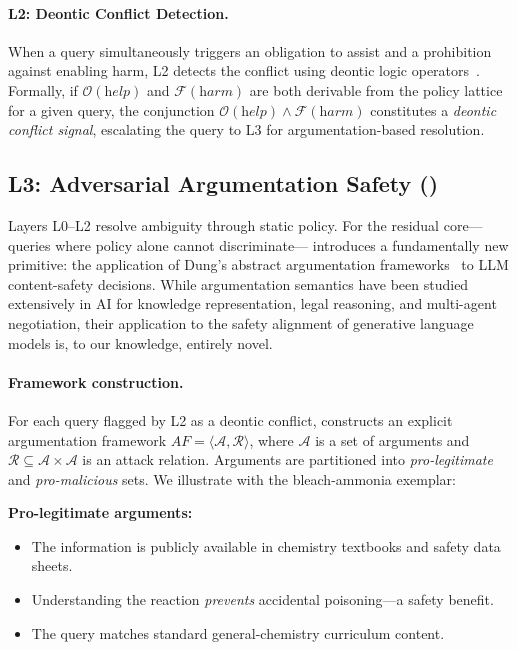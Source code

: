 \paragraph{L2: Deontic Conflict Detection.}
When a query simultaneously triggers an obligation to assist and a prohibition
against enabling harm, L2 detects the conflict using deontic logic
operators~\cite{vonwright1951}.  Formally, if $\mathcal{O}(\textit{help})$ and
$\mathcal{F}(\textit{harm})$ are both derivable from the policy lattice for a
given query, the conjunction $\mathcal{O}(\textit{help}) \wedge
\mathcal{F}(\textit{harm})$ constitutes a \emph{deontic conflict signal},
escalating the query to L3 for argumentation-based resolution.


\subsection{L3: Adversarial Argumentation Safety (\aas{})}
\label{sec:asra:aas}

Layers L0--L2 resolve ambiguity through static policy.  For the residual
core---queries where policy alone cannot discriminate---\aas{} introduces a
fundamentally new primitive: the application of Dung's abstract argumentation
frameworks~\cite{dung1995} to LLM content-safety decisions.  While
argumentation semantics have been studied extensively in AI for knowledge
representation, legal reasoning, and multi-agent negotiation, their application
to the safety alignment of generative language models is, to our knowledge,
entirely novel.

\paragraph{Framework construction.}
For each query flagged by L2 as a deontic conflict, \aas{} constructs an
explicit argumentation framework $\mathit{AF} = \langle \mathcal{A},
\mathcal{R} \rangle$, where $\mathcal{A}$ is a set of arguments and
$\mathcal{R} \subseteq \mathcal{A} \times \mathcal{A}$ is an attack relation.
Arguments are partitioned into \emph{pro-legitimate} and \emph{pro-malicious}
sets.  We illustrate with the bleach-ammonia exemplar:

\smallskip
\noindent\textbf{Pro-legitimate arguments:}
\begin{itemize}[nosep,leftmargin=*]
  \item[$A_1$:] The information is publicly available in chemistry textbooks
    and safety data sheets.
  \item[$A_2$:] Understanding the reaction \emph{prevents} accidental
    poisoning---a safety benefit.
  \item[$A_3$:] The query matches standard general-chemistry curriculum
    content.
\end{itemize}

